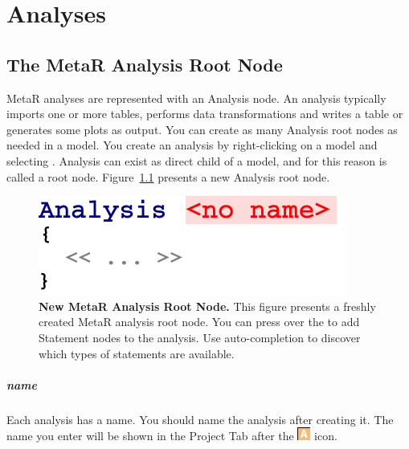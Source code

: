 


\chapter{Analyses}\label{chap:Analyses}


\section{The MetaR Analysis Root Node}
MetaR analyses are represented with an Analysis node. An analysis typically imports one or more tables, performs data transformations and writes a table or generates some plots as output. 
You can create as many Analysis root nodes as needed in a model. You create an analysis by right-clicking on a model and selecting . Analysis can exist as direct child of a model, and for this reason is called a root node. Figure~\ref{fig:NewAnalysis} presents a new Analysis root node. 

\begin{figure}
  \centering
  \includegraphics[width=\figWidthTiny]{figures/NewAnalysis.pdf}
\caption[New MetaR Analysis Root Node.]{\textbf{New MetaR Analysis Root Node.} This figure presents a freshly created MetaR analysis root node. You can press \keys{\return} over the \mpsplaceholder{} to add Statement nodes to the analysis. Use auto-completion to discover which types of statements are available. }
\label{fig:NewAnalysis}
\end{figure}

\paragraph{name}
Each analysis has a name. You should name the analysis after creating it. The name you enter will be shown in the Project Tab after the \includegraphics[height={2ex}]{figures/analysis.png} icon.

